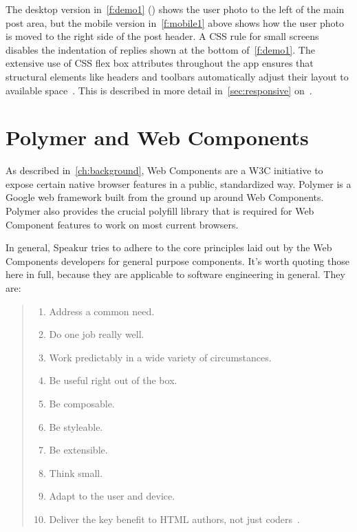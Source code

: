 The desktop version in~\cref{f:demo1} () shows the user photo to the left of the main post area, 
but the mobile version in~\cref{f:mobile1} above shows how the user photo is moved to the right side of the post header. 
A CSS  rule for small screens disables the indentation of replies shown at the bottom of~\cref{f:demo1}. 
The extensive use of CSS flex box attributes throughout the app ensures that structural elements like headers and toolbars automatically adjust their layout to available space~\cite{polymercontributors2015-d}. 
This is described in more detail in~\cref{sec:responsive} on~.

\section{Polymer and Web Components}
As described in~\cref{ch:background}, 
Web Components are a 
W3C initiative 
to expose certain native browser features in a public, standardized way. 
Polymer is a 
Google 
web framework built from the ground up around Web Components.
Polymer also provides the crucial 
polyfill library 
that is required for Web Component features to work on most current browsers.

In general, Speakur tries to adhere to the core principles laid out by the 
Web Components developers 
for general purpose components. 
It's worth quoting those here in full, 
because they are applicable to software engineering in general. They are:\label{sec:wcprinciples}
\begin{quote}
\begin{enumerate}
\item Address a common need.\label{wcp:commonneed}
\item Do one job really well.\label{wcp:onejob}
\item Work predictably in a wide variety of circumstances.\label{wcp:predicatable}
\item Be useful right out of the box.\label{wcp:useful}
\item Be composable.\label{wcp:composable}
\item Be styleable.\label{wcp:stylable}
\item Be extensible.\label{wcp:extensible}
\item Think small.\label{wcp:thinksmall}
\item Adapt to the user and device.\label{wcp:adaptable}
\item Deliver the key benefit to HTML authors, not just coders~\label{wcp:htmlauthors}\cite{webcomponentscontributors2014}.
\end{enumerate}
\end{quote}

